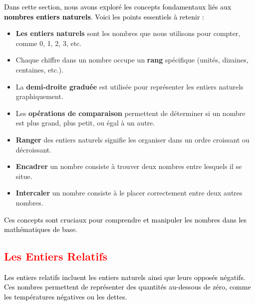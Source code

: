 \documentclass{article}
\begin{document}
\begin{tcolorbox}[colback=cyan!10!white, colframe=cyan!75!black, title=\textcolor{white}{Récapitulatif}, 
                  sharp corners=south]
    \textcolor{black}{Dans cette section, nous avons exploré les concepts fondamentaux liés aux \textbf{nombres entiers naturels}. Voici les points essentiels à retenir :}

    \begin{itemize}
        \item \textbf{Les entiers naturels} sont les nombres que nous utilisons pour compter, comme 0, 1, 2, 3, etc.
        \item Chaque chiffre dans un nombre occupe un \textbf{rang} spécifique (unités, dizaines, centaines, etc.).
        \item La \textbf{demi-droite graduée} est utilisée pour représenter les entiers naturels graphiquement.
        \item Les \textbf{opérations de comparaison} permettent de déterminer si un nombre est plus grand, plus petit, ou égal à un autre.
        \item \textbf{Ranger} des entiers naturels signifie les organiser dans un ordre croissant ou décroissant.
        \item \textbf{Encadrer} un nombre consiste à trouver deux nombres entre lesquels il se situe.
        \item \textbf{Intercaler} un nombre consiste à le placer correctement entre deux autres nombres.
    \end{itemize}

    \textcolor{black}{Ces concepts sont cruciaux pour comprendre et manipuler les nombres dans les mathématiques de base.}
\end{tcolorbox}


\vspace{0.5cm}

\subsection{\textcolor{red}{Les Entiers Relatifs}}

\vspace{0.35cm}

\begin{tcolorbox}[colback=cyan!10!white, colframe=red!75!black, title=\textcolor{white}{Définition}, 
                  sharp corners=southwest]

\textcolor{black}{Les entiers relatifs incluent les entiers naturels ainsi que leurs opposés négatifs. Ces nombres permettent de représenter des quantités au-dessous de zéro, comme les températures négatives ou les dettes.}
\end{tcolorbox}
\end{document}
